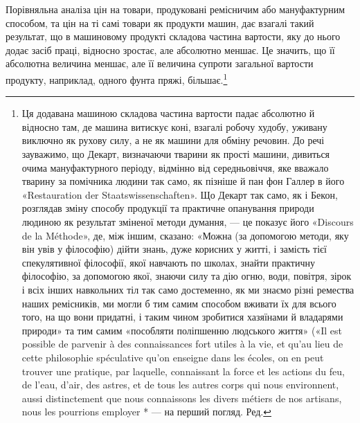 Порівняльна аналіза цін на товари, продуковані ремісничим
або мануфактурним способом, та цін на ті самі товари як продукти
машин, дає взагалі такий результат, що в машиновому продукті
складова частина вартости, яку до нього додає засіб праці, відносно
зростає, але абсолютно меншає. Це значить, що її абсолютна
величина меншає, але її величина супроти загальної вартости
продукту, наприклад, одного фунта пряжі, більшає.\footnote{
Ця додавана машиною складова частина вартости падає абсолютно
й відносно там, де машина витискує коні, взагалі робочу худобу,
уживану виключно як рухову силу, а не як машини для обміну речовин.
До речі зауважимо, що Декарт, визначаючи тварини як прості машини,
дивиться очима мануфактурного періоду, відмінно від середньовіччя,
яке вважало тварину за помічника людини так само, як пізніше й пан
фон Галлер в його «Restauration der Staatswissenschaften». Що Декарт
так само, як і Бекон, розглядав зміну способу продукції та практичне
опанування природи людиною як результат зміненої методи думання, —
це показує його «Discours de la Méthode», де, між іншим, сказано: «Можна
(за допомогою методи, яку він увів у філософію) дійти знань, дуже корисних
у житті, і замість тієї спекулятивної філософії, якої навчають по школах,
знайти практичну філософію, за допомогою якої, знаючи силу та дію
огню, води, повітря, зірок і всіх інших навкольних тіл так само достеменно,
як ми знаємо різні ремества наших ремісників, ми могли б тим
самим способом вживати їх для всього того, на що вони придатні, і таким
чином зробитися хазяїнами й владарями природи» та тим самим «пособляти
поліпшенню людського життя» («Il est possible de parvenir à des connaissances
fort utiles à la vie, et qu'au lieu de cette philosophie spéculative
qu’on enseigne dans les écoles, on en peut trouver une pratique, par laquelle,
connaissant la force et les actions du feu, de l’eau, d’air, des astres, et de
tous les autres corps qui nous environnent, aussi distinctement que nous
connaissons les divers métiers de nos artisans, nous les pourrions employer
* — на перший погляд. Ред.
}